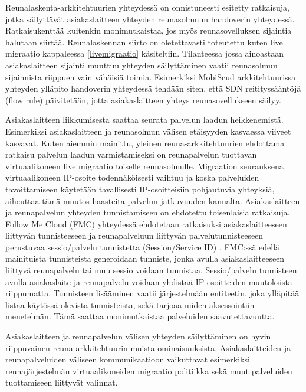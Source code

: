 Reunalaskenta-arkkitehtuurien yhteydessä on onnistuneesti esitetty ratkaisuja, jotka säilyttävät asiakaslaitteen yhteyden reunasolmuun handoverin yhteydessä. Ratkaisukenttää kuitenkin monimutkaistaa, jos myös reunasovelluksen sijaintia halutaan siirtää.
Reunalaskennan siirto on oletettavasti toteutettu kuten live migraatio kappaleessa \ref{livemigraatio} käsiteltiin.
Tilanteessa jossa ainoastaan asiakaslaitteen sijainti muuttuu yhteyden säilyttäminen vaatii reunasolmun sijainnista riippuen vain vähäisiä toimia. Esimerkiksi MobiScud arkkitehtuurissa yhteyden ylläpito handoverin yhteydessä tehdään siten, että SDN reitityssääntöjä (flow rule) päivitetään, jotta asiakaslaitteen yhteys reunasovellukseen säilyy. 

Asiakaslaitteen liikkumisesta saattaa seurata palvelun laadun heikkenemistä. Esimerkiksi asiakaslaitteen ja reunasolmun välisen etäisyyden kasvaessa viiveet kasvavat.
Kuten aiemmin mainittu, yleinen reuna-arkkitehtuurien ehdottama ratkaisu palvelun laadun varmistamiseksi on reunapalvelun tuottavan virtuaalikoneen live migraatio toiselle reunasolmulle.
Migraation seurauksena virtuaalikoneen IP-osoite todennäköisesti vaihtuu ja koska palveluiden tavoittamiseen käytetään tavallisesti IP-osoitteisiin pohjautuvia yhteyksiä, aiheuttaa tämä muutos haasteita palvelun jatkuvuuden kannalta.
Asiakaslaitteen ja reunapalvelun yhteyden tunnistamiseen on ehdotettu toisenlaisia ratkaisuja.
Follow Me Cloud (FMC) yhteydessä ehdotetaan ratkaisuksi asiakaslaitteeseen liittyvän tunnisteeseen ja reunapalveluun liittyvän palvelutunnisteeseen perustuvaa sessio/palvelu tunnistetta (Session/Service ID) \cite{taleb2013follow}.
FMC:ssä edellä mainituista tunnisteista generoidaan tunniste, jonka avulla asiakaslaitteeseen liittyvä reunapalvelu tai muu sessio voidaan tunnistaa.
Sessio/palvelu tunnisteen avulla asiakaslaite ja reunapalvelu voidaan yhdistää IP-osoitteiden muutoksista riippumatta.
Tunnisteen lisääminen vaatii järjestelmään entiteetin, joka ylläpitää listaa käytössä olevista tunnisteista, sekä tarjoaa niiden aksessointiin menetelmän. Tämä saattaa monimutkaistaa palveluiden saavutettavuutta. 

Asiakaslaitteen ja reunapalvelun välisen yhteyden säilyttäminen on hyvin riippuvainen reuna-arkkitehtuurin muista ominaisuuksista. Asiakaslaitteiden ja reunapalveluiden väliseen kommunikaatioon vaikuttavat esimerkiksi reunajärjestelmän virtuaalikoneiden migraatio politiikka sekä muut palveluiden tuottamiseen liittyvät valinnat.








